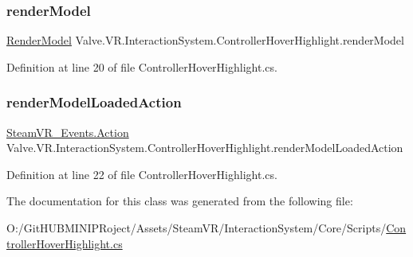 \subsubsection{\texorpdfstring{renderModel}{renderModel}}
{\footnotesize\ttfamily \mbox{\hyperlink{class_valve_1_1_v_r_1_1_interaction_system_1_1_render_model}{Render\+Model}} Valve.\+V\+R.\+Interaction\+System.\+Controller\+Hover\+Highlight.\+render\+Model\hspace{0.3cm}{\ttfamily [protected]}}



Definition at line 20 of file Controller\+Hover\+Highlight.\+cs.

\mbox{\label{class_valve_1_1_v_r_1_1_interaction_system_1_1_controller_hover_highlight_a7a576679245177cb0e5ecd9479901184}} 
\subsubsection{\texorpdfstring{renderModelLoadedAction}{renderModelLoadedAction}}
{\footnotesize\ttfamily \mbox{\hyperlink{class_valve_1_1_v_r_1_1_steam_v_r___events_1_1_action}{Steam\+V\+R\+\_\+\+Events.\+Action}} Valve.\+V\+R.\+Interaction\+System.\+Controller\+Hover\+Highlight.\+render\+Model\+Loaded\+Action\hspace{0.3cm}{\ttfamily [protected]}}



Definition at line 22 of file Controller\+Hover\+Highlight.\+cs.



The documentation for this class was generated from the following file\+:\begin{DoxyCompactItemize}
\item 
O\+:/\+Git\+H\+U\+B\+M\+I\+N\+I\+P\+Roject/\+Assets/\+Steam\+V\+R/\+Interaction\+System/\+Core/\+Scripts/\mbox{\hyperlink{_controller_hover_highlight_8cs}{Controller\+Hover\+Highlight.\+cs}}\end{DoxyCompactItemize}
